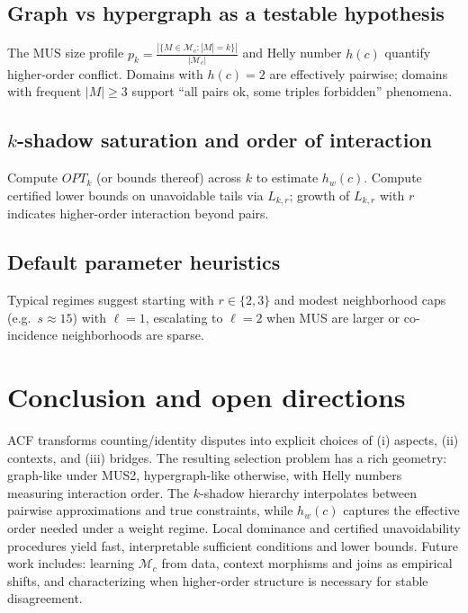 \documentclass[11pt]{article}
\theoremstyle{definition}
\theoremstyle{plain}
\theoremstyle{remark}
\begin{document}
\subsection{Graph vs hypergraph as a testable hypothesis}
The MUS size profile $p_k=\frac{|\{M\in\mathcal M_c:|M|=k\}|}{|\mathcal M_c|}$ and Helly number $h(c)$ quantify higher-order conflict.
Domains with $h(c)=2$ are effectively pairwise; domains with frequent $|M|\ge 3$ support ``all pairs ok, some triples forbidden'' phenomena.

\subsection{$k$-shadow saturation and order of interaction}
Compute $OPT_k$ (or bounds thereof) across $k$ to estimate $h_w(c)$.
Compute certified lower bounds on unavoidable tails via $L_{k,r}$; growth of $L_{k,r}$ with $r$ indicates higher-order interaction beyond pairs.

\subsection{Default parameter heuristics}
Typical regimes suggest starting with $r\in\{2,3\}$ and modest neighborhood caps (e.g.\ $s\approx 15$) with $\ell=1$, escalating to $\ell=2$ when MUS are larger or co-incidence neighborhoods are sparse.

\section{Conclusion and open directions}
ACF transforms counting/identity disputes into explicit choices of (i) aspects, (ii) contexts, and (iii) bridges. The resulting selection problem has a rich geometry: graph-like under MUS2, hypergraph-like otherwise, with Helly numbers measuring interaction order. The $k$-shadow hierarchy interpolates between pairwise approximations and true constraints, while $h_w(c)$ captures the effective order needed under a weight regime. Local dominance and certified unavoidability procedures yield fast, interpretable sufficient conditions and lower bounds. Future work includes: learning $\mathcal M_c$ from data, context morphisms and joins as empirical shifts, and characterizing when higher-order structure is necessary for stable disagreement.

\nocite{*}


\clearpage
\end{document}
